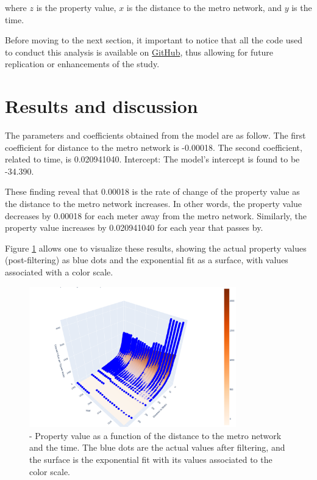 \documentclass[12pt]{gsis} %
\begin{document}
where $z$ is the property value, $x$ is the distance to the metro network, and $y$ is the time.

Before moving to the next section, it important to notice that all the code used to conduct this analysis is available on \href{https://github.com/Gui-FernandesBR/MetroImpactOnPropertyValues}{GitHub}, thus allowing for future replication or enhancements of the study.

\section{Results and discussion}

The parameters and coefficients obtained from the model are as follow.
The first coefficient for distance to the metro network is -0.00018.
The second coefficient, related to time, is 0.020941040.
Intercept: The model's intercept is found to be -34.390.

These finding reveal that 0.00018 is the rate of change of the property value as the distance to the metro network increases.
In other words, the property value decreases by 0.00018 for each meter away from the metro network.
Similarly, the property value increases by 0.020941040 for each year that passes by.

Figure \ref{fig:property-value} allows one to visualize these results, showing the actual property values (post-filtering) as blue dots and the exponential fit as a surface, with values associated with a color scale.

\begin{figure}[ht]
	\centering
	\includegraphics[width=0.8\textwidth]{figs/exponential_regression.png}
	\caption{- Property value as a function of the distance to the metro network and the time. The blue dots are the actual values after filtering, and the surface is the exponential fit with its values associated to the color scale.}
	\label{fig:property-value}
\end{figure}
\end{document}
